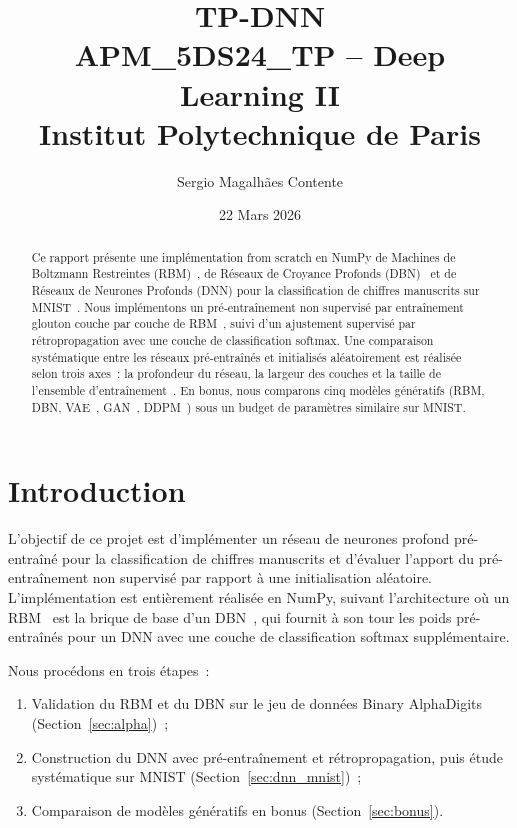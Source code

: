 \documentclass[11pt,a4paper]{article}
\title{\textbf{TP-DNN}\\[0.3cm]
\large APM\_5DS24\_TP -- Deep Learning II\\
Institut Polytechnique de Paris}
\author{Sergio Magalh\~{a}es Contente}
\date{22 Mars 2026}
\begin{document}
\maketitle

\begin{abstract}
Ce rapport pr\'esente une impl\'ementation from scratch en NumPy de Machines de Boltzmann Restreintes (RBM)~\cite{smolensky1986}, de R\'eseaux de Croyance Profonds (DBN)~\cite{hinton2006} et de R\'eseaux de Neurones Profonds (DNN) pour la classification de chiffres manuscrits sur MNIST~\cite{lecun1998}.
Nous impl\'ementons un pr\'e-entra\^inement non supervis\'e par entra\^inement glouton couche par couche de RBM~\cite{bengio2007}, suivi d'un ajustement supervis\'e par r\'etropropagation avec une couche de classification softmax.
Une comparaison syst\'ematique entre les r\'eseaux pr\'e-entra\^in\'es et initialis\'es al\'eatoirement est r\'ealis\'ee selon trois axes~: la profondeur du r\'eseau, la largeur des couches et la taille de l'ensemble d'entra\^inement~\cite{erhan2010}.
En bonus, nous comparons cinq mod\`eles g\'en\'eratifs (RBM, DBN, VAE~\cite{kingma2014}, GAN~\cite{goodfellow2014}, DDPM~\cite{ho2020}) sous un budget de param\`etres similaire sur MNIST.
\end{abstract}

\newpage
\tableofcontents
\newpage

\section{Introduction}

L'objectif de ce projet est d'impl\'ementer un r\'eseau de neurones profond pr\'e-entra\^in\'e pour la classification de chiffres manuscrits et d'\'evaluer l'apport du pr\'e-entra\^inement non supervis\'e par rapport \`a une initialisation al\'eatoire.
L'impl\'ementation est enti\`erement r\'ealis\'ee en NumPy, suivant l'architecture o\`u un RBM~\cite{smolensky1986} est la brique de base d'un DBN~\cite{hinton2006}, qui fournit \`a son tour les poids pr\'e-entra\^in\'es pour un DNN avec une couche de classification softmax suppl\'ementaire.

Nous proc\'edons en trois \'etapes~:
\begin{enumerate}
    \item Validation du RBM et du DBN sur le jeu de donn\'ees Binary AlphaDigits (Section~\ref{sec:alpha})~;
    \item Construction du DNN avec pr\'e-entra\^inement et r\'etropropagation, puis \'etude syst\'ematique sur MNIST (Section~\ref{sec:dnn_mnist})~;
    \item Comparaison de mod\`eles g\'en\'eratifs en bonus (Section~\ref{sec:bonus}).
\end{enumerate}
\end{document}
